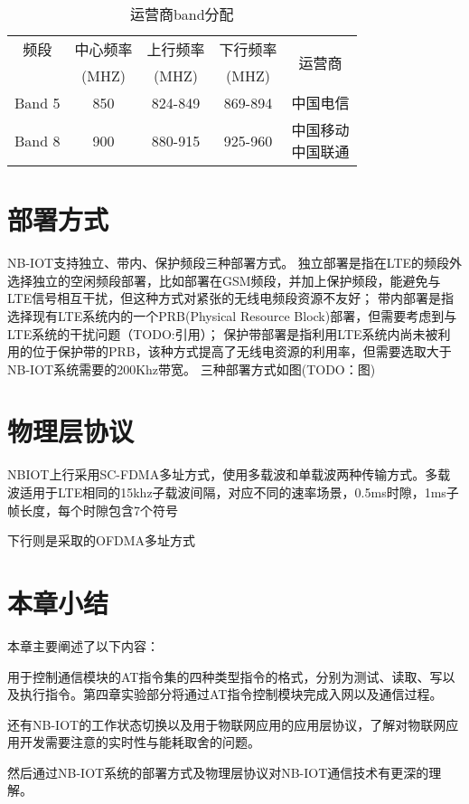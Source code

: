 \begin{table}[h!]
\caption{运营商band分配}
\begin{tabular}{ccccc}
\toprule
频段&中心频率&上行频率&下行频率&\multirow{2}{*}{运营商}\\
&(MHZ)&(MHZ)&(MHZ)&\\
\midrule
Band 5&850&824-849&869-894&中国电信\\
\midrule
Band 8&900&880-915&925-960&\makecell[c]{中国移动\\中国联通}\\
\bottomrule
\end{tabular}
\label{运营商band分配}
\end{table}


\section{部署方式}
NB-IOT支持独立、带内、保护频段三种部署方式。
独立部署是指在LTE的频段外选择独立的空闲频段部署，比如部署在GSM频段，并加上保护频段，能避免与LTE信号相互干扰，但这种方式对紧张的无线电频段资源不友好；
带内部署是指选择现有LTE系统内的一个PRB(Physical Resource Block)部署，但需要考虑到与LTE系统的干扰问题（TODO:引用）；
保护带部署是指利用LTE系统内尚未被利用的位于保护带的PRB，该种方式提高了无线电资源的利用率，但需要选取大于NB-IOT系统需要的200Khz带宽。
三种部署方式如图(TODO：图)


\section{物理层协议}

NBIOT上行采用SC-FDMA多址方式，使用多载波和单载波两种传输方式。多载波适用于LTE相同的15khz子载波间隔，对应不同的速率场景，0.5ms时隙，1ms子帧长度，每个时隙包含7个符号

下行则是采取的OFDMA多址方式

\section{本章小结}

本章主要阐述了以下内容：

用于控制通信模块的AT指令集的四种类型指令的格式，分别为测试、读取、写以及执行指令。第四章实验部分将通过AT指令控制模块完成入网以及通信过程。

还有NB-IOT的工作状态切换以及用于物联网应用的应用层协议，了解对物联网应用开发需要注意的实时性与能耗取舍的问题。

然后通过NB-IOT系统的部署方式及物理层协议对NB-IOT通信技术有更深的理解。